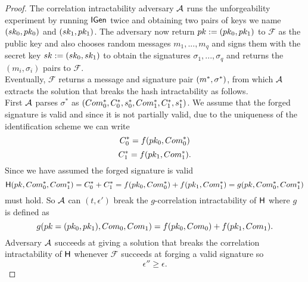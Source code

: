 \begin{proof}
The correlation intractability adversary $\mathcal{A}$ runs the unforgeability experiment by
running $\mathsf{IGen}$ twice and obtaining two pairs of keys we name $(sk_0,pk_0)$ and $(sk_1, pk_1)$. The adversary now return 
$pk := (pk_0, pk_1)$ to $\mathcal{F}$ as the public key and also
chooses random messages $m_1,...,m_q$ and signs them with the secret key 
$sk := (sk_0, sk_1)$ to obtain the signatures $\sigma_1,...,\sigma_q$ and returns the $(m_i,\sigma_i)$ pairs to $\mathcal{F}$.
\\
Eventually, $\mathcal{F}$ returns a message and signature pair 
 $(m^*, \sigma^*)$, from which $\mathcal{A}$ extracts the solution that breaks the hash intractability as follows.
 \\
 First $\mathcal{A}$ parses $\sigma^*$
as
$(Com^*_{0},C^*_{0},s^*_{0}, Com^*_{1}, C^*_{1},s^*_{1})$.
We assume that the forged signature is valid and since it is not partially valid, due to the uniqueness of the identification scheme
 we can write
$$C^*_0 = f(pk_0,Com^*_0)$$
$$C^*_1 = f(pk_1,Com^*_1).$$
Since we have assumed the forged signature is valid 
$$\mathsf{H}(pk,Com^*_0,Com^*_1)=C^*_0+C^*_1 =  f(pk_0,Com^*_0)+ f(pk_1,Com^*_1) = g(pk,Com^*_0,Com^*_1)$$
must hold.
So $\mathcal{A}$ can $(t,\epsilon')$ break the $g$-correlation intractability of $\mathsf{H}$ where $g$ is defined as 
$$g(pk=(pk_0,pk_1), Com_0, Com_1) =  f(pk_0,Com_0)+ f(pk_1,Com_1).$$
Adversary $\mathcal{A}$ succeeds at giving a solution that breaks the correlation intractability of $\mathsf{H}$ whenever $\mathcal{F}$ succeeds at forging a valid signature so
$$\epsilon''\geq\epsilon.$$

\end{proof}



